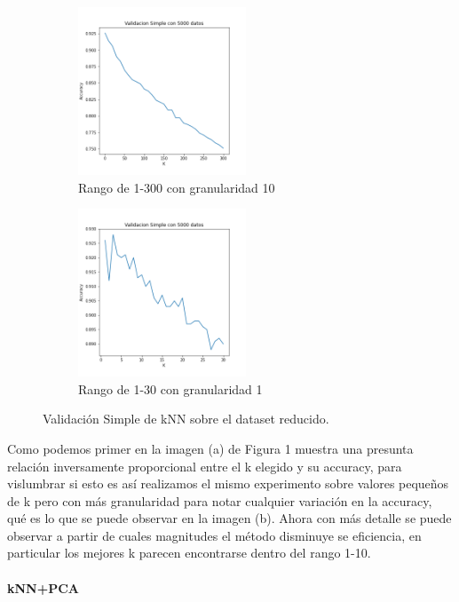 \begin{figure}[h]
\begin{subfigure}{0.5\textwidth}
\includegraphics[width=0.9\linewidth, height=5cm]{images/validacionSimple_knnsolo.png} 
\caption{Rango de 1-300 con granularidad 10}
\label{fig:subimbar_medio1}
\end{subfigure}
\begin{subfigure}{0.5\textwidth}
\includegraphics[width=0.9\linewidth, height=5cm]{images/validacionSimple_knnsolo_Kchicos.png} 
\caption{Rango de 1-30 con granularidad 1}
\label{fig:subimbar_medio2}
\end{subfigure}
\caption{Validación Simple de kNN sobre el dataset reducido.}
\label{knn_preliminar}%
\end{figure}

\par

Como podemos primer en la imagen (a) de Figura 1 muestra una presunta relación inversamente proporcional entre el k elegido y su accuracy, para vislumbrar si esto es así realizamos el mismo experimento sobre valores pequeños de k pero con más granularidad para notar cualquier variación en la accuracy, qué es lo que se puede observar en la imagen (b). Ahora con más detalle se puede observar a partir de cuales magnitudes el método disminuye se eficiencia, en particular los mejores k parecen encontrarse dentro del rango 1-10.

\paragraph{kNN+PCA}

